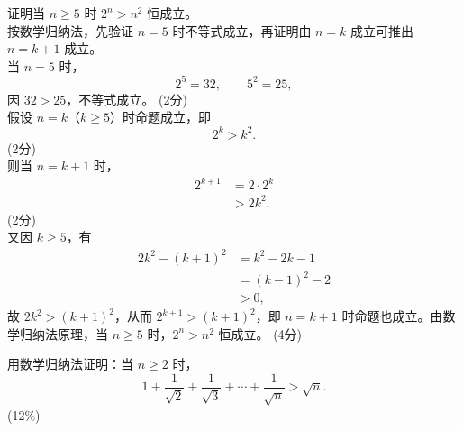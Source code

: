 \documentclass[12pt,a4paper]{exam-zh}
\begin{document}
\begin{solution}
    证明当 $n\geqslant 5$ 时 $2^n>n^2$ 恒成立。\\
    按数学归纳法，先验证 $n=5$ 时不等式成立，再证明由 $n=k$ 成立可推出 $n=k+1$ 成立。\\
    当 $n=5$ 时，
    \[
    2^5=32,\qquad 5^2=25,
    \]
    因 $32>25$，不等式成立。
    \hfill (2分) \\
    假设 $n=k$（$k\geqslant 5$）时命题成立，即
    \[
    2^k>k^2.
    \]
    \hfill (2分) \\
    则当 $n=k+1$ 时，
    \begin{align*}
        2^{k+1} &= 2\cdot 2^k \\
        &> 2k^2.
    \end{align*}
    \hfill (2分) \\
    又因 $k\geqslant 5$，有
    \begin{align*}
        2k^2-(k+1)^2 &= k^2-2k-1 \\
        &= (k-1)^2-2 \\
        &>0,
    \end{align*}
    故 $2k^2>(k+1)^2$，从而 $2^{k+1}>(k+1)^2$，即 $n=k+1$ 时命题也成立。由数学归纳法原理，当 $n\geqslant 5$ 时，$2^n>n^2$ 恒成立。
    \hfill (4分)
\end{solution}

\begin{question}[points = 12]
    用数学归纳法证明：当 $n\geqslant 2$ 时，
    \[
    1+\dfrac{1}{\sqrt{2}}+\dfrac{1}{\sqrt{3}}+\cdots+\dfrac{1}{\sqrt{n}}>\sqrt{n}.
    \]
    \hfill (12\%)
\end{question}
\end{document}
